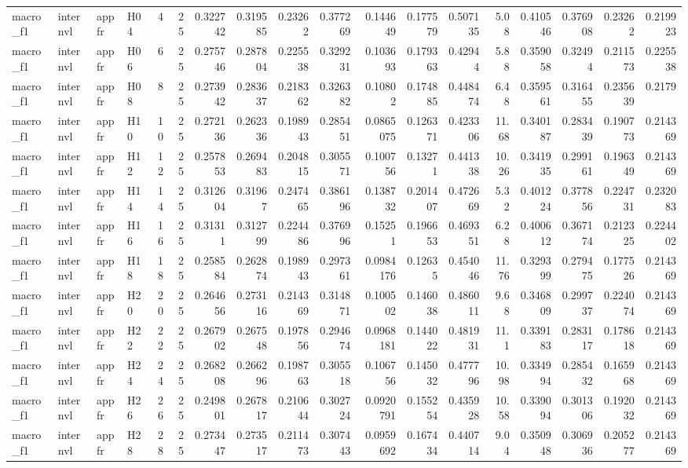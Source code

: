 \begin{longtable}{llllrrrrrrrrrrrrrr}
macro\_f1 & internvl & appfr & H04 & 4 & 25 & 0.322742 & 0.319585 & 0.23262 & 0.377269 & 0.144649 & 0.177579 & 0.507135 & 5.08 & 0.410546 & 0.376908 & 0.23262 & 0.219923 \\
macro\_f1 & internvl & appfr & H06 & 6 & 25 & 0.275746 & 0.287804 & 0.225538 & 0.329231 & 0.103693 & 0.179363 & 0.42944 & 5.88 & 0.359058 & 0.32494 & 0.211573 & 0.225538 \\
macro\_f1 & internvl & appfr & H08 & 8 & 25 & 0.273942 & 0.283637 & 0.218362 & 0.326382 & 0.10802 & 0.174885 & 0.448474 & 6.48 & 0.359561 & 0.316455 & 0.235639 & 0.2179 \\
macro\_f1 & internvl & appfr & H10 & 10 & 25 & 0.272136 & 0.262336 & 0.198943 & 0.285451 & 0.0865075 & 0.126371 & 0.423306 & 11.68 & 0.340187 & 0.283439 & 0.190773 & 0.214369 \\
macro\_f1 & internvl & appfr & H12 & 12 & 25 & 0.257853 & 0.269483 & 0.204815 & 0.305571 & 0.100756 & 0.13271 & 0.441338 & 10.26 & 0.341935 & 0.299161 & 0.196349 & 0.214369 \\
macro\_f1 & internvl & appfr & H14 & 14 & 25 & 0.312604 & 0.31967 & 0.247465 & 0.386196 & 0.138732 & 0.201407 & 0.472669 & 5.32 & 0.401224 & 0.377856 & 0.224731 & 0.232083 \\
macro\_f1 & internvl & appfr & H16 & 16 & 25 & 0.31311 & 0.312799 & 0.224486 & 0.376996 & 0.15251 & 0.196653 & 0.469351 & 6.28 & 0.400612 & 0.367174 & 0.212325 & 0.224402 \\
macro\_f1 & internvl & appfr & H18 & 18 & 25 & 0.258584 & 0.262874 & 0.198943 & 0.297361 & 0.0984176 & 0.12635 & 0.454046 & 11.76 & 0.329399 & 0.279475 & 0.177526 & 0.214369 \\
macro\_f1 & internvl & appfr & H20 & 20 & 25 & 0.264656 & 0.273116 & 0.214369 & 0.314871 & 0.100502 & 0.146038 & 0.486011 & 9.68 & 0.346809 & 0.299737 & 0.224074 & 0.214369 \\
macro\_f1 & internvl & appfr & H22 & 22 & 25 & 0.267902 & 0.267548 & 0.197856 & 0.294674 & 0.0968181 & 0.144022 & 0.481931 & 11.1 & 0.339183 & 0.283117 & 0.178618 & 0.214369 \\
macro\_f1 & internvl & appfr & H24 & 24 & 25 & 0.268208 & 0.266296 & 0.198763 & 0.305518 & 0.106756 & 0.145032 & 0.477796 & 10.98 & 0.334994 & 0.285432 & 0.165968 & 0.214369 \\
macro\_f1 & internvl & appfr & H26 & 26 & 25 & 0.249801 & 0.267817 & 0.210644 & 0.302724 & 0.0920791 & 0.155254 & 0.435928 & 10.58 & 0.339094 & 0.301306 & 0.192032 & 0.214369 \\
macro\_f1 & internvl & appfr & H28 & 28 & 25 & 0.273447 & 0.273517 & 0.211473 & 0.307443 & 0.0959692 & 0.167434 & 0.440714 & 9.04 & 0.350948 & 0.306936 & 0.205277 & 0.214369 \\

\end{longtable}
